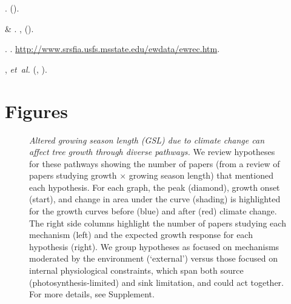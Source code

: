 \documentclass[11pt]{article}
\begin{document}
\begin{thebibliography}{100}
\newblock {}.
\newblock \emph{}
   ().

 \& 
\newblock {}.
\newblock \emph{} \textbf{}, 
  ().

.
\newblock {}.
\newblock \urlprefix\url{http://www.srsfia.usfs.msstate.edu/ewdata/ewrec.htm}.

,  \emph{et~al.}
\newblock \emph{} (,
  ).

\end{thebibliography}
 

\clearpage
\section{Figures}

\begin{figure}[h!]
\caption{\emph{Altered growing season length (GSL) due to climate change can affect tree growth through diverse pathways.} We review hypotheses for these pathways showing the number of papers (from a review of papers studying growth $\times$ growing season length) that mentioned each hypothesis. For each graph, the peak (diamond), growth onset (start), and change in area under the curve (shading) is highlighted for the growth curves before (blue) and after (red) climate change. The right side columns highlight the number of papers studying each mechanism (left) and the expected growth response for each hypothesis (right). We group hypotheses as focused on mechanisms moderated by the environment (`external') versus those focused on internal physiological constraints, which span both source (photosynthesis-limited) and sink limitation, and could act together. For more details, see Supplement.} 
\end{figure}
\end{document}
